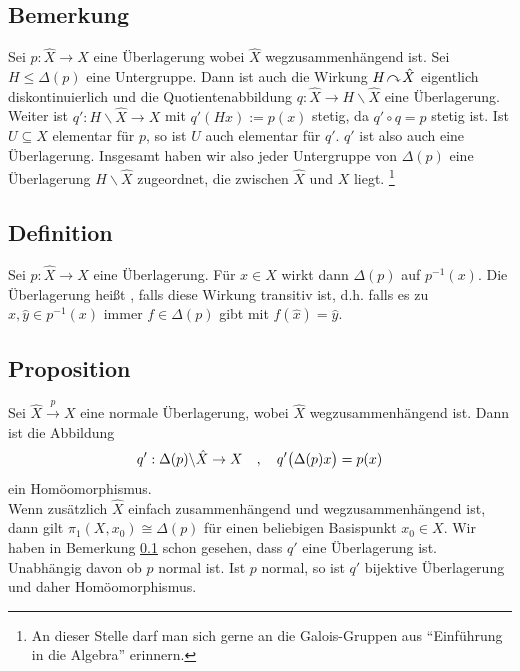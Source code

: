 \subsection[Bemerkung zu Untergruppen der Decktransformationsgruppe]{Bemerkung} %
\label{sub:12.8}
\begin{figure}
\end{figure}
Sei $p : \hat{X} \to X$ eine Überlagerung wobei $\hat{X}$ wegzusammenhängend ist. Sei $H \le \Delta(p)$ eine Untergruppe. Dann ist auch die Wirkung $H \wirkung \hat{X}$
eigentlich diskontinuierlich und die Quotientenabbildung $q : \hat{X} \to H \backslash \hat{X}$ eine Überlagerung. Weiter ist $q' : H \backslash \hat{X} \to X$ mit
$q'(Hx) := p(x)$ stetig, da $q' \circ q = p$ stetig ist. Ist $U \subseteq X$ elementar für $p$, so ist $U$ auch elementar für $q'$. $q'$ ist also auch eine Überlagerung.
Insgesamt haben wir also jeder Untergruppe von $\Delta (p)$ eine Überlagerung $H \backslash \hat{X}$ zugeordnet, die zwischen $\hat{X}$ und $X$ liegt. \footnote{An dieser
Stelle darf man sich gerne an die Galois-Gruppen aus \enquote{Einführung in die Algebra} erinnern.}

\subsection[Definition: Normale Überlagerung]{Definition} %
\label{sub:12.9}
Sei $p : \hat{X} \to X$ eine Überlagerung. Für $x \in X$ wirkt dann $\Delta(p)$ auf $p^{-1}(x)$. Die Überlagerung heißt 
, falls diese Wirkung transitiv ist, d.h. falls es zu $\hat{x}, \hat{y} \in p^{-1}(x)$ immer $f \in \Delta(p)$ gibt mit 
$f(\hat{x})= \hat{y}$.

\subsection[Proposition: Für normale Überlagerungen ist \protect{$q' :\Delta(p)\text{\textbackslash{}} \hat{X} \to X$} ein Homöomorphismus]{Proposition} %
\label{sub:1210}
Sei $\hat{X} \xrightarrow{p} X $ eine normale Überlagerung, wobei $\hat{X}$ wegzusammenhängend ist. Dann ist die Abbildung 
\[
	q' : \Delta(p)\backslash \hat{X} \to X \quad , \quad q' \enbrace[\big]{\Delta(p) x} = p(x)
\]
ein Homöomorphismus. \\
Wenn zusätzlich $\hat{X}$ einfach zusammenhängend und wegzusammenhängend ist, dann gilt $\pi_1(X, x_0) \cong \Delta(p)$ für einen beliebigen Basispunkt $x_0 \in X$.
Wir haben in Bemerkung \ref{sub:12.8} schon gesehen, dass $q'$ eine Überlagerung ist. Unabhängig davon ob $p$ normal ist. Ist $p$ normal, so ist $q'$ bijektive 
Überlagerung und daher Homöomorphismus. \bewende 
\newpage

